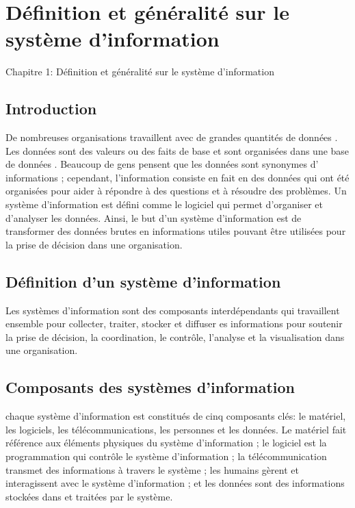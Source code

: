 \documentclass[12pt, letterpaper]{article}
\begin{document}
\chapter{Définition et généralité sur le système d'information}
\begin{center}
    \huge{Chapitre 1: Définition et généralité sur le système d'information}
\end{center}

\section{Introduction}
De nombreuses organisations travaillent avec de grandes quantités de
données . Les données sont des valeurs ou des faits de base et sont
organisées dans une base de données . Beaucoup de gens pensent que
les données sont synonymes d' informations ; cependant, l'information
consiste en fait en des données qui ont été organisées pour aider à
répondre à des questions et à résoudre des problèmes. Un système
d'information est défini comme le logiciel qui permet d'organiser et
d'analyser les données. Ainsi, le but d'un système d'information est 
de transformer des données brutes en informations utiles pouvant être
utilisées pour la prise de décision dans une organisation.

\section{Définition d'un système d'information}
Les systèmes d'information sont des composants interdépendants qui
travaillent ensemble pour collecter, traiter, stocker et diffuser 
es informations pour soutenir la prise de décision, la coordination,
le contrôle, l'analyse et la visualisation dans une organisation.
\cite{Prog}

\section{Composants des systèmes d'information}
chaque système d'information est constitués de cinq composants clés: 
le matériel, les logiciels, les télécommunications, les personnes et
les données. Le matériel fait référence aux éléments physiques du 
système d'information ; le logiciel est la programmation qui contrôle 
le système d'information ; la télécommunication transmet des 
informations à travers le système ; les humains gèrent et interagissent
avec le système d'information ; et les données sont des informations 
stockées dans et traitées par le système.
\end{document}
